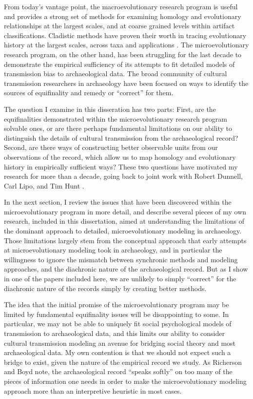 From today's vantage point, the macroevolutionary research program is useful and provides a strong set of methods for examining homology and evolutionary relationships at the largest scales, and at coarse grained levels within artifact classifications.  Cladistic methods have proven their worth in tracing evolutionary history at the largest scales, across taxa and applications .  The microevolutionary research program, on the other hand, has been struggling for the last decade to demonstrate the empirical sufficiency of its attempts to fit detailed models of transmission bias to archaeological data.  The broad community of cultural transmission researchers in archaeology have been focused on ways to identify the sources of equifinality and remedy or ``correct'' for them.  

The question I examine in this disseration has two parts:  First, are the equifinalities demonstrated within the microevolutionary research program solvable ones, or are there perhaps fundamental limitations on our ability to distinguish the details of cultural transmission from the archaeological record?  Second, are there ways of constructing better observable units from our observations of the record, which allow us to map homology and evolutionary history in empirically sufficient ways?  These two questions have motivated my research for more than a decade, going back to joint work with Robert Dunnell, Carl Lipo, and Tim Hunt \citep{Lipo1997,lipomadsen1997,lipomadsenhunt1995b}.  

In the next section, I review the issues that have been discovered within the microevolutionary program in more detail, and describe several pieces of my own research, included in this dissertation, aimed at understanding the limitations of the dominant approach to detailed, microevolutionary modeling in archaeology. Those limitations largely stem from the conceptual approach that early attempts at microevolutionary modeling took in archaeology, and in particular the willingness to ignore the mismatch between synchronic methods and modeling approaches, and the diachronic nature of the archaeological record.  But as I show in one of the papers included here, we are unlikely to simply ``correct'' for the diachronic nature of the records simply by creating better methods.  

The idea that the initial promise of the microevolutionary program may be limited by fundamental equifinality issues will be disappointing to some.  In particular, we may not be able to uniquely fit social psychological models of transmission to archaeological data, and this limits our ability to consider cultural transmission modeling an avenue for bridging social theory and most archaeological data.  My own contention is that we should not expect such a bridge to exist, given the nature of the empirical record we study.  As Richerson and Boyd \citeyearpar{richerson2008response} note, the archaeological record ``speaks softly'' on too many of the pieces of information one needs in order to make the microevolutionary modeling approach more than an interpretive heuristic in most cases. 

